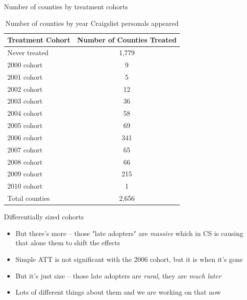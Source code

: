\documentclass{beamer}
\begin{document}
\begin{frame}[shrink=20]{Number of counties by treatment cohorts}
\begin{table}[htbp]\centering
\caption{Number of counties by year Craigslist personals appeared}\label{tab:countybycohort}
\begin{tabular}{lc}
\toprule
\textbf{Treatment Cohort} & \textbf{Number of Counties Treated} \\
\midrule
Never treated&       1,779\\
2000 cohort &           9\\
2001 cohort &           5\\
2002 cohort &          12\\
2003 cohort &          36\\
2004 cohort &          58\\
2005 cohort &          69\\
2006 cohort &         341\\
2007 cohort &          65\\
2008 cohort &          66\\
2009 cohort &         215\\
2010 cohort &           1\\
\midrule
Total counties &     2,656 \\
\bottomrule
\end{tabular}
\end{table}
\end{frame}

\begin{frame}{Differentially sized cohorts}

\begin{itemize}
\item But there's more -- those "late adopters" are \emph{massive} which in CS is causing that alone them to shift the effects
\item Simple ATT is not significant with the 2006 cohort, but it is when it's gone
\item But it's just size -- those late adopters are \emph{rural}, they are \emph{much later}
\item Lots of different things about them and we are working on that now
\end{itemize}

\end{frame}
\end{document}

